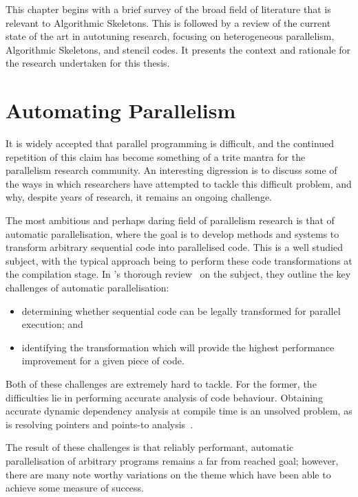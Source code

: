This chapter begins with a brief survey of the broad field of
literature that is relevant to Algorithmic Skeletons. This is followed
by a review of the current state of the art in autotuning research,
focusing on heterogeneous parallelism, Algorithmic Skeletons, and
stencil codes. It presents the context and rationale for the research
undertaken for this thesis.


\section{Automating Parallelism}

It is widely accepted that parallel programming is difficult, and the
continued repetition of this claim has become something of a trite
mantra for the parallelism research community. An interesting
digression is to discuss some of the ways in which researchers have
attempted to tackle this difficult problem, and why, despite years of
research, it remains an ongoing challenge.



The most ambitious and perhaps daring field of parallelism research is
that of automatic parallelisation, where the goal is to develop
methods and systems to transform arbitrary sequential code into
parallelised code. This is a well studied subject, with the typical
approach being to perform these code transformations at the
compilation stage. In \citeauthor{Banerjee1993}'s thorough
review~\cite{Banerjee1993} on the subject, they outline the key
challenges of automatic parallelisation:
%
\begin{itemize}
\item determining whether sequential code can be legally transformed
  for parallel execution; and
\item identifying the transformation which will provide the highest
  performance improvement for a given piece of code.
\end{itemize}
%
Both of these challenges are extremely hard to tackle. For the former,
the difficulties lie in performing accurate analysis of code
behaviour. Obtaining accurate dynamic dependency analysis at compile
time is an unsolved problem, as is resolving pointers and points-to
analysis~\cite{Atkin-granville2013, Hind2001,Ghiya2001}.

The result of these challenges is that reliably performant, automatic
parallelisation of arbitrary programs remains a far from reached goal;
however, there are many note worthy variations on the theme which have
been able to achieve some measure of success.


